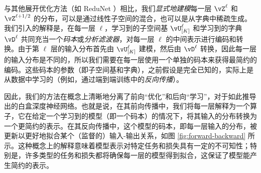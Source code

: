 \documentclass[../../book-main_zh.tex]{subfiles}
\begin{document}

\begin{remark}\label{sub:forward_backward}
    与其他展开优化方法（如 ReduNet \cite{chan2021redunet}）相比，我们\textit{显式地建模}每一层 $\vZ^\ell$ 和 $\vZ^{\ell + 1/2}$ 的分布，可以是通过线性子空间的混合，也可以是从字典中稀疏生成。我们引入的解释是，在每一层 \(\ell\)，学习到的子空间基 \(\vU_{[K]}^{\ell}\) 和学习到的字典 \(\vD^{\ell}\) 共同充当一个\textit{码本}或\textit{分析滤波器}，对每一层 \(\ell\) 的中间表示进行编码和转换。由于第 \(\ell\) 层的输入分布首先由 \(\vU_{[K]}^{\ell}\) 建模，然后由 \(\vD^{\ell}\) 转换，因此每一层的输入分布是不同的，所以我们需要在每一层使用一个单独的码本来获得最简约的编码。这些码本的参数（即子空间基和字典），之前假设是完全已知的，实际上是从数据中学习的（例如，通过端到端训练中的\textit{反向传播}）。

    因此，我们的方法在概念上清晰地分离了前向“优化”和后向“学习”，对于如此推导出的白盒深度神经网络。也就是说，在其前向传播中，我们将每一层解释为一个算子，它在给定一个学习到的模型（即一个码本）的情况下，将其输入的分布转换为一个更简约的表示。在其反向传播中，这个模型的码本，即每一层输入的分布，被更新以更好地拟合某个（监督的）输入-输出关系，如图 \ref{fig:forward-backward} 所示。这种概念上的解释意味着模型表示对特定任务和损失具有一定的不可知性；特别是，许多类型的任务和损失都将确保每一层的模型得到拟合，这保证了模型能产生简约的表示。
\end{remark}





\end{document}
